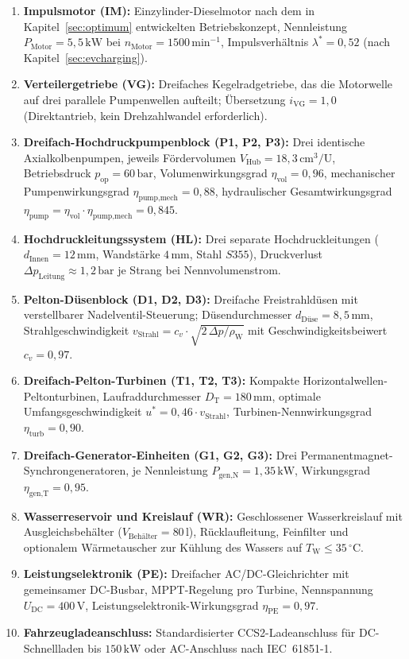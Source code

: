 ﻿\documentclass[a4paper,12pt]{article}
\begin{document}
\begin{enumerate}
  \item \textbf{Impulsmotor (IM):} Einzylinder-Dieselmotor nach dem in
    Kapitel~\ref{sec:optimum} entwickelten Betriebskonzept, Nennleistung
    $P_\text{Motor} = 5{,}5\,\text{kW}$ bei $n_\text{Motor} = 1500\,\text{min}^{-1}$,
    Impulsverhältnis $\lambda^* = 0{,}52$ (nach Kapitel~\ref{sec:evcharging}).
  \item \textbf{Verteilergetriebe (VG):} Dreifaches Kegelradgetriebe, das
    die Motorwelle auf drei parallele Pumpenwellen aufteilt; Übersetzung
    $i_\text{VG} = 1{,}0$ (Direktantrieb, kein Drehzahlwandel erforderlich).
  \item \textbf{Dreifach-Hochdruckpumpenblock (P1, P2, P3):} Drei identische
    Axialkolbenpumpen, jeweils Fördervolumen $V_\text{Hub} = 18{,}3\,\text{cm}^3/\text{U}$,
    Betriebsdruck $p_\text{op} = 60\,\text{bar}$, Volumenwirkungsgrad
    $\eta_\text{vol} = 0{,}96$, mechanischer Pumpenwirkungsgrad
    $\eta_\text{pump,mech} = 0{,}88$, hydraulischer Gesamtwirkungsgrad
    $\eta_\text{pump} = \eta_\text{vol} \cdot \eta_\text{pump,mech} = 0{,}845$.
  \item \textbf{Hochdruckleitungssystem (HL):} Drei separate Hochdruckleitungen
    ($d_\text{Innen} = 12\,\text{mm}$, Wandstärke $4\,\text{mm}$, Stahl
    $S355$), Druckverlust $\Delta p_\text{Leitung} \approx 1{,}2\,\text{bar}$
    je Strang bei Nennvolumenstrom.
  \item \textbf{Pelton-Düsenblock (D1, D2, D3):} Dreifache Freistrahldüsen
    mit verstellbarer Nadelventil-Steuerung; Düsendurchmesser
    $d_\text{Düse} = 8{,}5\,\text{mm}$, Strahlgeschwindigkeit
    $v_\text{Strahl} = c_v \cdot \sqrt{2\,\Delta p / \rho_\text{W}}$
    mit Geschwindigkeitsbeiwert $c_v = 0{,}97$.
  \item \textbf{Dreifach-Pelton-Turbinen (T1, T2, T3):} Kompakte
    Horizontalwellen-Peltonturbinen, Laufraddurchmesser $D_\text{T} = 180\,\text{mm}$,
    optimale Umfangsgeschwindigkeit $u^* = 0{,}46 \cdot v_\text{Strahl}$,
    Turbinen-Nennwirkungsgrad $\eta_\text{turb} = 0{,}90$.
  \item \textbf{Dreifach-Generator-Einheiten (G1, G2, G3):} Drei
    Permanentmagnet-Synchrongeneratoren, je Nennleistung
    $P_\text{gen,N} = 1{,}35\,\text{kW}$, Wirkungsgrad
    $\eta_\text{gen,T} = 0{,}95$.
  \item \textbf{Wasserreservoir und Kreislauf (WR):} Geschlossener
    Wasserkreislauf mit Ausgleichsbehälter ($V_\text{Behälter} = 80\,\text{l}$),
    Rücklaufleitung, Feinfilter und optionalem Wärmetauscher zur Kühlung
    des Wassers auf $T_\text{W} \leq 35\,^\circ\text{C}$.
  \item \textbf{Leistungselektronik (PE):} Dreifacher AC/DC-Gleichrichter
    mit gemeinsamer DC-Busbar, MPPT-Regelung pro Turbine, Nennspannung
    $U_\text{DC} = 400\,\text{V}$, Leistungselektronik-Wirkungsgrad
    $\eta_\text{PE} = 0{,}97$.
  \item \textbf{Fahrzeugladeanschluss:} Standardisierter CCS2-Ladeanschluss
    für DC-Schnellladen bis $150\,\text{kW}$ oder AC-Anschluss nach
    IEC~61851-1.
\end{enumerate}
\end{document}
